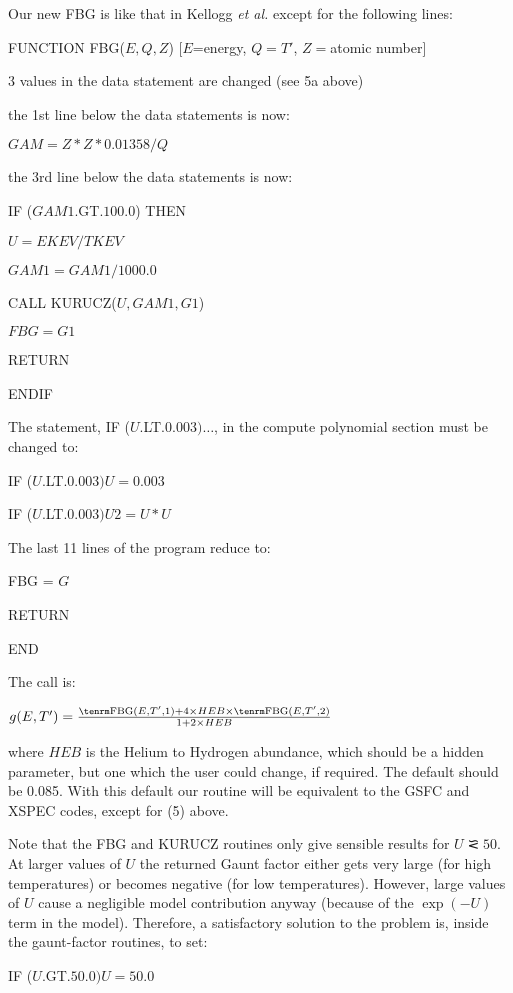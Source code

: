 {Our new FBG is like that in Kellogg {\it et al.} except
for the following lines:

\qquad  FUNCTION FBG($E,Q,Z$) [$E$=energy, $Q=T'$, $Z=$atomic number]

3 values in the data statement are changed (see 5a above)

the 1st line below the data statements is now:

\qquad  $GAM=Z*Z*0.01358/Q$

the 3rd line below the data statements is now:

\qquad IF ($GAM1$.GT.$100.0$) THEN

\qquad\qquad $U = EKEV/TKEV$

\qquad\qquad $GAM1 = GAM1/1000.0$

\qquad\qquad CALL KURUCZ($U, GAM1, G1$)

\qquad\qquad $FBG = G1$

\qquad\qquad RETURN

\qquad ENDIF

The statement, IF ($U$.LT.$0.003) \ldots $, in
the compute polynomial section must be changed to:

\qquad IF ($U$.LT.$0.003) U=0.003$

\qquad IF ($U$.LT.$0.003) U2=U * U$

The last 11 lines of the program reduce to:

  FBG = $G$

\qquad     RETURN

\qquad      END

The call is:

$g(E,T') = {{\rm FBG}(E,T',1) + 4 \times HEB \times {\rm FBG}(E,T',2) \over
1 + 2 \times HEB}$

where $HEB$ is the Helium to Hydrogen abundance, which should be a
hidden parameter, but one which the user could change, if required.
The default should be 0.085.  With this default our
routine will be equivalent to the GSFC and XSPEC codes, except for (5) above.

}
{\listlist

Note that the FBG and KURUCZ routines only give sensible results for
$U \simless 50$.  At larger values of $U$ the returned Gaunt factor
either
gets very large (for high temperatures) or becomes negative (for low temperatures).
However, large values of $U$ cause a negligible model contribution
anyway (because of the $\exp (-U)$ term in the model).  Therefore, a satisfactory
solution
to the problem is, inside the gaunt-factor routines, to set:

\qquad IF ($U$.GT.$50.0) U=50.0$

} 

